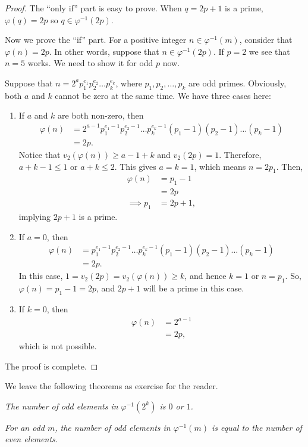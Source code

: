\documentclass{subfile}
\begin{document}
		\begin{proof}
			The ``only if'' part is easy to prove. When $q=2p+1$ is a prime, $\varphi(q)=2p$ so $q\in\varphi^{-1}(2p)$.
			
			Now we prove the ``if'' part. For a positive integer $n\in\varphi^{-1}(m)$, consider that $\varphi(n)=2p$. In other words, suppose that $n \in\varphi^{-1}(2p)$.  If $p=2$ we see that $n=5$ works. We need to show it for odd $p$ now.
			
			Suppose that $n= 2^a p_1^{e_1}p_2^{e_2}\dots p_k^{e_k}$, where $p_1, p_2, \dots, p_k$ are odd primes. Obviously, both $a$ and $k$ cannot be zero at the same time. We have three cases here:
			
				\begin{enumerate}
					\item If $a$ and $k$ are both non-zero, then
						\begin{align*}
							\varphi(n) &= 2^{a-1} p_1^{e_1-1}p_2^{e_2-1}\dots p_k^{e_k-1} (p_1-1)(p_2-1)\dots (p_k-1)\\
									   &= 2p.
						\end{align*}
					Notice that $v_2(\varphi(n)) \geq a-1+k$ and $v_2(2p)=1$. Therefore, $a+k-1 \leq 1$ or $a+k \leq 2$. This gives $a=k=1$, which means $n=2p_1$. Then,
						\begin{align*}
							\varphi(n)   &= p_1-1\\
									     &= 2p\\
							\implies p_1 &= 2p+1,
						\end{align*}
					implying $2p+1$ is a prime.
					
					\item If $a=0$, then
						\begin{align*}
							\varphi(n) &= p_1^{e_1-1}p_2^{e_2-1}\dots p_k^{e_k-1} (p_1-1)(p_2-1)\dots (p_k-1)\\
									   &= 2p.
						\end{align*}
					In this case, $1 = v_2(2p) = v_2(\varphi(n)) \geq k$, and hence $k=1$ or $n=p_1$. So, $\varphi(n)=p_1-1=2p$, and $2p+1$ will be a prime in this case.
					
					\item If $k=0$, then
						\begin{align*}
							\varphi(n) &= 2^{a-1}\\
									   &= 2p,
						\end{align*}
					which is not possible.
				\end{enumerate}
			The proof is complete.
		\end{proof}
	
	We leave the following theorems as exercise for the reader.
		\begin{theorem}\slshape
			The number of odd elements in $\varphi^{-1}(2^k)$ is $0$ or $1$.
		\end{theorem}
		
		\begin{theorem}\slshape
			For an odd $m$, the number of odd elements in $\varphi^{-1}(m)$ is equal to the number of even elements.
		\end{theorem}
	
\end{document}
